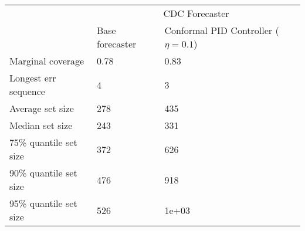 \begin{tabular}{lll}
\toprule
& \multicolumn{2}{c}{CDC Forecaster} \\
& Base forecaster & Conformal PID Controller ($\eta=0.1$) \\
\midrule
Marginal coverage & 0.78 & 0.83 \\
Longest err sequence & 4 & 3 \\
Average set size & 278 & 435 \\
Median set size & 243 & 331 \\
75\% quantile set size & 372 & 626 \\
90\% quantile set size & 476 & 918 \\
95\% quantile set size & 526 & 1e+03 \\
\bottomrule
\end{tabular}
